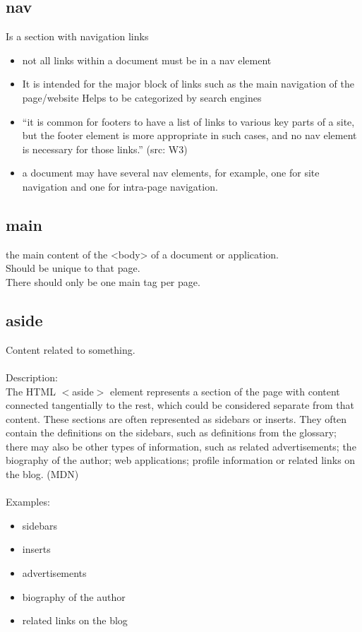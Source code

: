 \documentclass[]{article}
\begin{document}
\subsection{nav}
Is a section with navigation links
\begin{itemize}
	\item not all links within a document must be in a nav element
	
	\item It is intended for the major block of links
	\subitem such as the main navigation of the page/website
	\subitem Helps to be categorized by search engines
	
	\item “it is common for footers to have a list of links to various key parts of a site, but the footer element is more appropriate in such cases, and no nav element is necessary for those links.” (src: W3)
	
	\item a document may have several nav elements, for example, one for site navigation and one for intra-page navigation.
\end{itemize}

\subsection{main}
the main content of the <body> of a document or application.
\\
Should be unique to that page.
\\
There should only be one main tag per page.

\subsection{aside}
Content related to something.
\\\\
Description:
\\
The HTML $<$aside$>$ element represents a section of the page with content connected tangentially to the rest, which could be considered separate from that content. These sections are often represented as sidebars or inserts. They often contain the definitions on the sidebars, such as definitions from the glossary; there may also be other types of information, such as related advertisements; the biography of the author; web applications; profile information or related links on the blog. (MDN)
\\\\
Examples:
\begin{itemize}
	\item sidebars
	\item inserts
	\item advertisements
	\item biography of the author
	\item related links on the blog
\end{itemize}
\end{document}
